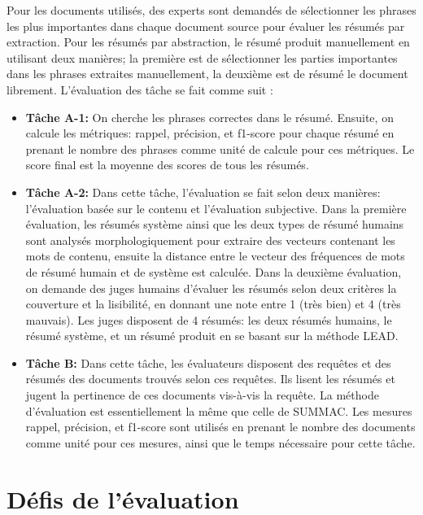 \documentclass[a4paper,12pt,oneside]{../use/ESIthesis}
\begin{document}
Pour les documents utilisés, des experts sont demandés de sélectionner les phrases les plus importantes dans chaque document source pour évaluer les résumés par extraction. 
Pour les résumés par abstraction, le résumé produit manuellement en utilisant deux manières; la première est de sélectionner les parties importantes dans les phrases extraites manuellement, la deuxième est de résumé le document librement. 
L'évaluation des tâche se fait comme suit \cite{01-fukusima-okumura}:
\begin{itemize}
\item \textbf{Tâche A-1:} On cherche les phrases correctes dans le résumé.
Ensuite, on calcule les métriques: rappel, précision, et f1-score pour chaque résumé en prenant le nombre des phrases comme unité de calcule pour ces métriques. 
Le score final est la moyenne des scores de tous les résumés. 

\item \textbf{Tâche A-2:} Dans cette tâche, l'évaluation se fait selon deux manières: l'évaluation basée sur le contenu et l'évaluation subjective. 
Dans la première évaluation, les résumés système ainsi que les deux types de résumé humains sont analysés morphologiquement pour extraire des vecteurs contenant les mots de contenu, ensuite la distance entre le vecteur des fréquences de mots de résumé humain et de système est calculée. 
Dans la deuxième évaluation, on demande des juges humains d'évaluer les résumés selon deux critères la couverture et la lisibilité, en donnant une note entre 1 (très bien) et 4 (très mauvais). 
Les juges disposent de 4 résumés: les deux résumés humains, le résumé système, et un résumé produit en se basant sur la méthode LEAD. 

\item \textbf{Tâche B:} Dans cette tâche, les évaluateurs disposent des requêtes et des résumés des documents trouvés selon ces requêtes. 
Ils lisent les résumés et jugent la pertinence de ces documents vis-à-vis la requête. 
La méthode d'évaluation est essentiellement la même que celle de SUMMAC. 
Les mesures rappel, précision, et f1-score sont utilisés en prenant le nombre des documents comme unité pour ces mesures, ainsi que le temps nécessaire pour cette tâche. 
\end{itemize}

\section{Défis de l'évaluation} 
\end{document}
